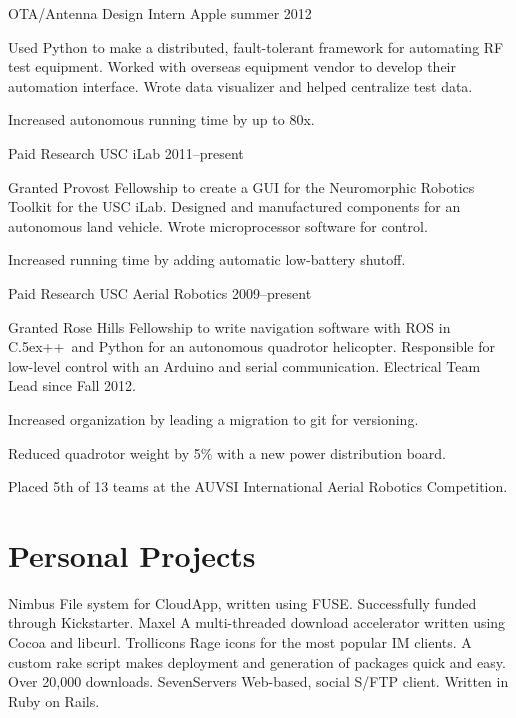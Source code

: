 \documentclass[print]{friggeri-cv}
\newenvironment{itemize*}%
  {\begin{itemize}%
    \setlength{\itemsep}{0pt}%
    \setlength{\parskip}{0pt}}%
  {\end{itemize}}
\def\Cplusplus{{\rm C\raise.5ex\hbox{\small ++}}}
\begin{document}
\workexperience
  {OTA/Antenna Design Intern}
  {Apple}
  {summer 2012}
  {
  Used Python to make a distributed, fault-tolerant framework for automating RF test equipment. Worked with overseas equipment vendor to develop their automation interface. Wrote data visualizer and helped centralize test data.
  \begin{itemize*}
    \item Increased autonomous running time by up to 80x.
  \end{itemize*}
  }
\workexperience
  {Paid Research}
  {USC iLab}
  {2011--present}
  {
  Granted Provost Fellowship to create a GUI for the Neuromorphic Robotics Toolkit for the USC iLab. Designed and manufactured components for an autonomous land vehicle. Wrote microprocessor software for control.
  \begin{itemize*}
    \item Increased running time by adding automatic low-battery shutoff.
  \end{itemize*}
  }
\workexperience
  {Paid Research}
  {USC Aerial Robotics}
  {2009--present}
  {
  Granted Rose Hills Fellowship to write navigation software with ROS in \Cplusplus\ and Python for an autonomous quadrotor helicopter. Responsible for low-level control with an Arduino and serial communication. Electrical Team Lead since Fall 2012.
  \begin{itemize*}
    \item Increased organization by leading a migration to git for versioning.
    \item Reduced quadrotor weight by 5\% with a new power distribution board.
    \item Placed 5th of 13 teams at the AUVSI International Aerial Robotics Competition.
  \end{itemize*}
  }

\section{Personal Projects}

\begin{entrylist}
  \project
    {Nimbus}
    {File system for CloudApp, written using FUSE. Successfully funded through Kickstarter.}
  \project
    {Maxel}
    {A multi-threaded download accelerator written using Cocoa and libcurl.}
  \project
    {Trollicons}
    {Rage icons for the most popular IM clients. A custom rake script makes deployment and generation of packages quick and easy. Over 20,000 downloads.}
  \project
    {SevenServers}
    {Web-based, social S/FTP client. Written in Ruby on Rails.}
\end{entrylist}

\nopagebreak
\end{document}
